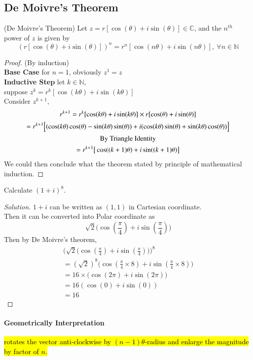 \documentclass[10pt]{article}
\begin{document}
		\subsection{De Moivre's Theorem}
		\begin{theorem}(De Moivre's Theorem)
			Let $z = r[\cos(\theta) + i \sin(\theta)] \in \mathbb{C}$, and the $n^{th}$ power of $z$ is given by
			\[
				(r[\cos(\theta) + i \sin(\theta)])^n = r^n [\cos(n\theta) + i \sin(n \theta)],\ \forall n \in \mathbb{N}
			\]
		\end{theorem}
		\begin{proof}
			(By induction) \\
			\textbf{Base Case} for $n=1$, obviously $z^1 = z$ \\
			\textbf{Inductive Step} let $k \in \mathbb{N}$, \\
			suppose $z^k = r^k [\cos(k \theta) + i \sin(k \theta)]$ \\
			Consider $z^{k+1}$, \\
			\begin{gather*}
				r^{k+1} = r^k [\cos(k \theta) + i \sin(k \theta)] \times r[\cos(\theta) + i \sin(\theta)] \\
				= r^{k+1} \Big[
					(\cos(k \theta) \cos(\theta) - \sin (k \theta) \sin(\theta)) + 
					i (\cos(k \theta) \sin(\theta) + \sin(k \theta) \cos(\theta))
				\Big] \\
				\text{{By Triangle Identity}} \\
				= r^{k+1} \big[ \cos((k+1)\theta) + i \sin((k+1) \theta) \big ]
			\end{gather*}
			We could then conclude what the theorem stated by principle of mathematical induction.
		\end{proof}
		
		\begin{example}
			Calculate $(1+i)^8$. 
			\begin{proof}[Solution]
				$1+i$ can be written as $(1,1)$ in Cartesian coordinate. \\
				Then it can be converted into Polar coordinate as 
				\[
					\sqrt{2} \Big ( \cos(\frac{\pi}{4}) + i \sin(\frac{\pi}{4})\Big)
				\]
				Then by De Moivre's theorem,
				\begin{gather*}
					\Big( \sqrt{2} \Big ( \cos(\frac{\pi}{4}) + i \sin(\frac{\pi}{4})\Big) \Big)^8 \\
					= (\sqrt{2})^8 \Big ( \cos(\frac{\pi}{4} \times 8) + i \sin(\frac{\pi}{4} \times 8)\Big) \\
					= 16 \times \Big ( \cos(2\pi) + i \sin(2\pi)\Big) \\
					= 16 (\cos(0) + i \sin(0)) \\
					= 16
				\end{gather*}
			\end{proof}
		\paragraph{Geometrically Interpretation}\hl{rotates the vector anti-clockwise by $(n-1)\theta$-radius and enlarge the magnitude by factor of $n$.}
		\end{example}
		
\end{document}
